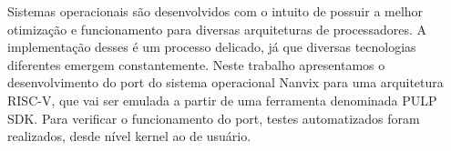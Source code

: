 \begin{resumo}
    Sistemas operacionais são desenvolvidos com o intuito de possuir a melhor otimização e funcionamento para diversas arquiteturas de 
    processadores. A implementação desses é um processo delicado, já que diversas tecnologias diferentes emergem constantemente. Neste 
    trabalho apresentamos o desenvolvimento do port do sistema operacional Nanvix para uma arquitetura RISC-V, que vai ser emulada a 
    partir de uma ferramenta denominada PULP SDK. Para verificar o funcionamento do port, testes automatizados foram realizados, desde 
    nível kernel ao de usuário. 
\end{resumo}